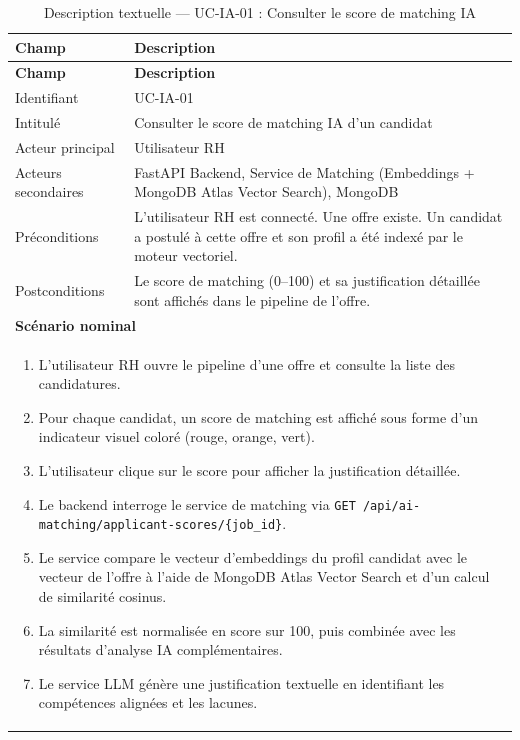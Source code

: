 \renewcommand{\arraystretch}{1.4}
\begin{longtable}{|p{4cm}|p{10cm}|}
\caption{Description textuelle — UC-IA-01 : Consulter le score de matching IA}
\label{tab:uc_ia01} \\
\hline
\rowcolor[HTML]{EFEFEF} \textbf{Champ} & \textbf{Description} \\ \hline
\endfirsthead
\hline
\rowcolor[HTML]{EFEFEF} \textbf{Champ} & \textbf{Description} \\ \hline
\endhead
\hline
\endfoot
\hline
\endlastfoot
Identifiant & UC-IA-01 \\ \hline
Intitulé & Consulter le score de matching IA d'un candidat \\ \hline
Acteur principal & Utilisateur RH \\ \hline
Acteurs secondaires & FastAPI Backend, Service de Matching (Embeddings + MongoDB Atlas Vector Search), MongoDB \\ \hline
Préconditions & L'utilisateur RH est connecté. Une offre existe. Un candidat a postulé à cette offre et son profil a été indexé par le moteur vectoriel. \\ \hline
Postconditions & Le score de matching (0–100) et sa justification détaillée sont affichés dans le pipeline de l'offre. \\ \hline
\multicolumn{2}{|l|}{\textbf{Scénario nominal}} \\ \hline
\multicolumn{2}{|p{14.5cm}|}{
\vspace{2pt}
\begin{enumerate}
    \item L'utilisateur RH ouvre le pipeline d'une offre et consulte la liste des candidatures.
    \item Pour chaque candidat, un score de matching est affiché sous forme d'un indicateur visuel coloré (rouge, orange, vert).
    \item L'utilisateur clique sur le score pour afficher la justification détaillée.
    \item Le backend interroge le service de matching via \texttt{GET /api/ai-matching/applicant-scores/\{job\_id\}}.
    \item Le service compare le vecteur d'embeddings du profil candidat avec le vecteur de l'offre à l'aide de MongoDB Atlas Vector Search et d'un calcul de similarité cosinus.
    \item La similarité est normalisée en score sur 100, puis combinée avec les résultats d'analyse IA complémentaires.
    \item Le service LLM génère une justification textuelle en identifiant les compétences alignées et les lacunes.

\end{enumerate}}
\end{longtable}
